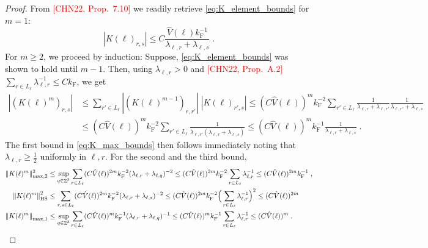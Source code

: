 \documentclass[sn-mathphys, Numbered ,a4paper]{sn-jnl}%
\DeclareMathOperator{\Z}{\mathbb{Z}}
\newcommand{\F}{\mathrm{F}}
\newcommand{\normmaxi}[1]{\norm{#1}_{\mathrm{max,1}}}
\theoremstyle{plain}
\theoremstyle{definition}
\theoremstyle{remark}
\theoremstyle{plain}
\theoremstyle{definition}
\theoremstyle{remark}
\begin{document}
\begin{proof}
From \textcolor{red}{[CHN22, Prop.~7.10]} we readily retrieve \eqref{eq:K_element_bounds} for $ m = 1 $:
\begin{equation}
	|K(\ell)_{r,s}|
	\le C \frac{\hat{V}(\ell) k_{\F}^{-1}}{\lambda_{\ell,r} + \lambda_{\ell,s}} \;.
\end{equation}
For $ m \ge 2 $, we proceed by induction: Suppose, \eqref{eq:K_element_bounds} was shown to hold until $ m-1 $. Then, using $ \lambda_{\ell,r} > 0 $ and \textcolor{red}{[CHN22, Prop.~A.2]} $ \sum_{r \in L_\ell} \lambda_{\ell,r}^{-1} \le C k_{\F} $, we get
\begin{equation}
	\begin{aligned}
		|(K(\ell)^m)_{r,s}|
		&\le \sum_{r' \in L_\ell}
		|(K(\ell)^{m-1})_{r,r'}| \;
		|K(\ell)_{r',s}|
		\le (C \hat{V}(\ell))^m k_{\F}^{-2} \sum_{r' \in L_\ell}
		\frac{1}{\lambda_{\ell, r} + \lambda_{\ell, r'}}
		\frac{1}{\lambda_{\ell, r'} + \lambda_{\ell, s}} \\
		&\le (C \hat{V}(\ell))^m k_{\F}^{-2} \sum_{r' \in L_\ell}
		\frac{1}{\lambda_{\ell, r'} (\lambda_{\ell, r} + \lambda_{\ell, s})}
		\le (C \hat{V}(\ell))^m k_{\F}^{-1}
		\frac{1}{\lambda_{\ell, r} + \lambda_{\ell, s}} \;.
	\end{aligned}
\end{equation}
The first bound in \eqref{eq:K_max_bounds} then follows immediately noting that $ \lambda_{\ell,r} \ge \frac 12 $ uniformly in $ \ell, r $. For the second and the third bound,
\begin{equation} \label{eq:max2_HS_bound}
\begin{aligned}
	\Vert K(\ell)^m \Vert_{\mathrm{max},2}^2
	&\le \sup_{q \in \Z^3} \sum_{r \in L_\ell} (C \hat{V}(\ell))^{2m} k_{\F}^{-2} (\lambda_{\ell,r} + \lambda_{\ell,q})^{-2}
	\le (C \hat{V}(\ell))^{2m} k_{\F}^{-2} \sum_{r \in L_\ell} \lambda_{\ell,r}^{-1}
	\le (C \hat{V}(\ell))^{2m} k^{-1}_{\F} \;, \\
	\norm{K(\ell)^m}_{\mathrm{HS}}^2
	&\le \sum_{r,s \in L_\ell} (C \hat{V}(\ell))^{2m} k_{\F}^{-2} (\lambda_{\ell,r} + \lambda_{\ell,s})^{-2}
	\le (C \hat{V}(\ell))^{2m} k_{\F}^{-2} \Big( \sum_{r \in L_\ell}  \lambda_{\ell,r}^{-1} \Big)^2
	\le (C \hat{V}(\ell))^{2m} \; \\
	\normmaxi{K(\ell)^m} 
	&\leq \sup_{q \in \Z^3} \sum_{r \in L_\ell} (C \hat{V}(\ell))^{m} k_{\F}^{-1} (\lambda_{\ell,r} + \lambda_{\ell,q})^{-1} \le (C \hat{V}(\ell))^{m} k_{\F}^{-1} \sum_{r \in L_\ell} \lambda_{\ell,r}^{-1} \leq (C \hat{V}(\ell))^{m} \;.
\end{aligned}

\end{equation}
\end{proof}
\end{document}
